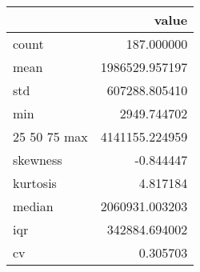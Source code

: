 \begin{tabular}{lr}
\toprule
 & value \\
\midrule
count & 187.000000 \\
mean & 1986529.957197 \\
std & 607288.805410 \\
min & 2949.744702 \\
25%
50%
75%
max & 4141155.224959 \\
skewness & -0.844447 \\
kurtosis & 4.817184 \\
median & 2060931.003203 \\
iqr & 342884.694002 \\
cv & 0.305703 \\
\bottomrule
\end{tabular}
